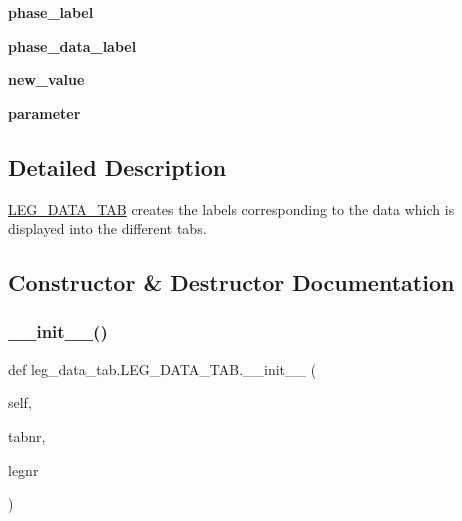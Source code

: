 \begin{DoxyCompactItemize}
{\bfseries phase\+\_\+label}
\item 
\mbox{\label{classleg__data__tab_1_1LEG__DATA__TAB_a431146711699c97c41fcc4d2f30dbfa4}} 
{\bfseries phase\+\_\+data\+\_\+label}
\item 
\mbox{\label{classleg__data__tab_1_1LEG__DATA__TAB_a4834562ae71ad597e4ab8bd22e6ebaef}} 
{\bfseries new\+\_\+value}
\item 
\mbox{\label{classleg__data__tab_1_1LEG__DATA__TAB_a27d233a82241db952a4d022e9e75d307}} 
{\bfseries parameter}
\end{DoxyCompactItemize}


\subsection{Detailed Description}
\hyperlink{classleg__data__tab_1_1LEG__DATA__TAB}{L\+E\+G\+\_\+\+D\+A\+T\+A\+\_\+\+T\+AB} creates the labels corresponding to the data which is displayed into the different tabs. 



\subsection{Constructor \& Destructor Documentation}
\mbox{\label{classleg__data__tab_1_1LEG__DATA__TAB_a804e68298406312ced8c4331f3e1483d}} 
\subsubsection{\texorpdfstring{\+\_\+\+\_\+init\+\_\+\+\_\+()}{\_\_init\_\_()}}
{\footnotesize\ttfamily def leg\+\_\+data\+\_\+tab.\+L\+E\+G\+\_\+\+D\+A\+T\+A\+\_\+\+T\+A\+B.\+\_\+\+\_\+init\+\_\+\+\_\+ (\begin{DoxyParamCaption}\item[{}]{self,  }\item[{}]{tabnr,  }\item[{}]{legnr }\end{DoxyParamCaption})}



